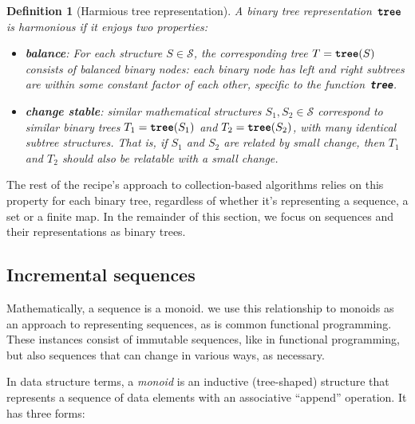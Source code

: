 \documentclass[11pt]{article}
\renewcommand{\ottkw}[1]{\textbf{\texttt{#1}}}
\newtheorem{definition}{Definition}
\begin{document}
\begin{definition}[Harmious tree representation]
  A binary tree representation~$\ottkw{tree}$ is \emph{harmonious} if
  it enjoys two properties:
\begin{itemize}

\item \textbf{balance}: For each structure $S \in \mathcal{S}$, the
  corresponding tree $T = \ottkw{tree}(S)$ consists of \emph{balanced
  binary nodes}: each binary node has left and right subtrees are
  within some constant factor of each other, specific to the function~\ottkw{tree}.

\item \textbf{change stable}: similar mathematical structures $S_1,
  S_2 \in \mathcal{S}$ correspond to similar binary trees $T_1 =
  \ottkw{tree}(S_1)$ and $T_2 = \ottkw{tree}(S_2)$, with many
  identical subtree structures.  That is, if $S_1$ and $S_2$ are
  related by small change, then $T_1$ and $T_2$ should also be
  relatable with a small change.

\end{itemize}

\end{definition}

The rest of the recipe's approach to collection-based algorithms
relies on this property for each binary tree, regardless of
whether it's representing a sequence, a set or a finite map.
%
In the remainder of this section, we focus on sequences and their
representations as binary trees.

\subsection{Incremental sequences}

Mathematically, a sequence is a monoid.
%
we use this relationship to monoids as an approach to representing sequences,
as is common functional programming.
%
These instances consist of immutable sequences, like in functional programming,
but also sequences that can change in various ways, as necessary.

In data structure terms, a \emph{monoid} is an inductive (tree-shaped)
structure that represents a sequence of data elements with an associative ``append'' operation.
%
It has three forms:
\end{document}
